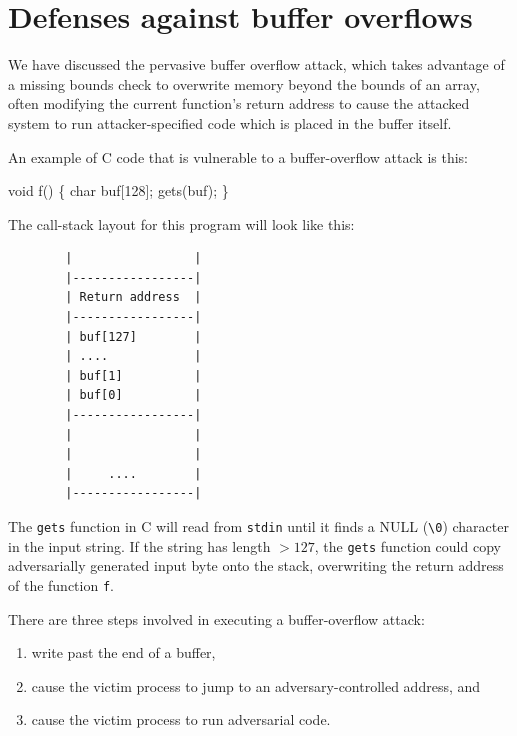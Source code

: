 \documentclass[
  letterpaper,
]{scrbook}
\newenvironment{Shaded}{\begin{snugshade}}{\end{snugshade}}
\newcommand{\DataTypeTok}[1]{\textcolor[rgb]{0.68,0.00,0.00}{#1}}
\newcommand{\DecValTok}[1]{\textcolor[rgb]{0.68,0.00,0.00}{#1}}
\newcommand{\NormalTok}[1]{\textcolor[rgb]{0.00,0.23,0.31}{#1}}
\newcommand{\OperatorTok}[1]{\textcolor[rgb]{0.37,0.37,0.37}{#1}}
\providecommand{\tightlist}{%
  \setlength{\itemsep}{0pt}\setlength{\parskip}{0pt}}
\theoremstyle{definition}
\theoremstyle{plain}
\theoremstyle{plain}
\theoremstyle{remark}
\begin{document}
\section{Defenses against buffer
overflows}\label{defenses-against-buffer-overflows}

We have discussed the pervasive buffer overflow attack, which takes
advantage of a missing bounds check to overwrite memory beyond the
bounds of an array, often modifying the current function's return
address to cause the attacked system to run attacker-specified code
which is placed in the buffer itself.

An example of C code that is vulnerable to a buffer-overflow attack is
this:

\begin{Shaded}
\begin{Highlighting}[numbers=left,,]
\DataTypeTok{void}\NormalTok{ f}\OperatorTok{()} \OperatorTok{\{}
  \DataTypeTok{char}\NormalTok{ buf}\OperatorTok{[}\DecValTok{128}\OperatorTok{];}
\NormalTok{  gets}\OperatorTok{(}\NormalTok{buf}\OperatorTok{);}
\OperatorTok{\}}
\end{Highlighting}
\end{Shaded}

The call-stack layout for this program will look like this:

\begin{verbatim}
        |                 |
        |-----------------|
        | Return address  |
        |-----------------|
        | buf[127]        |
        | ....            |
        | buf[1]          |
        | buf[0]          |
        |-----------------|
        |                 |
        |                 |
        |     ....        |
        |-----------------|
\end{verbatim}

The \texttt{gets} function in C will read from \texttt{stdin} until it
finds a NULL (\texttt{\textbackslash{}0}) character in the input string.
If the string has length \(>127\), the \texttt{gets} function could copy
adversarially generated input byte onto the stack, overwriting the
return address of the function \texttt{f}.

There are three steps involved in executing a buffer-overflow attack:

\begin{enumerate}
\def\labelenumi{\arabic{enumi}.}
\tightlist
\item
  write past the end of a buffer,
\item
  cause the victim process to jump to an adversary-controlled address,
  and
\item
  cause the victim process to run adversarial code.
\end{enumerate}
\end{document}
